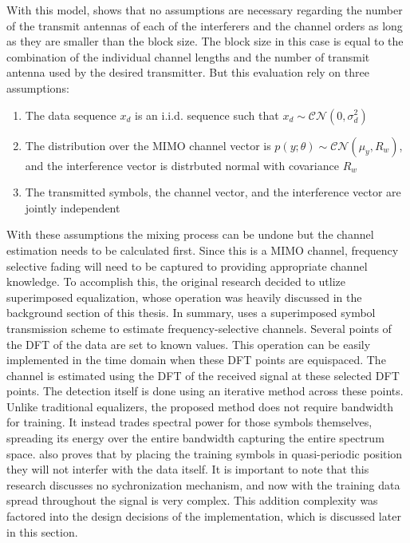 With this model, \cite{midterm_report} shows that no assumptions are necessary regarding the number of the transmit antennas of each of the interferers and the channel orders as long as they are smaller than the block size.  The block size in this case is equal to the combination of the individual channel lengths and the number of transmit antenna used by the desired transmitter.  But this evaluation rely on three assumptions:

\begin{enumerate}
\item The data sequence \(x_{d}\) is an i.i.d. sequence such that \(x_{d}\sim\mathcal{CN}(0,\sigma_{d}^{2})\)

\item The distribution over the MIMO channel vector is \(p(y;\theta)\sim\mathcal{CN}(\mu_{y},R_{w})\), and the interference vector is distrbuted normal with covariance \(R_{w}\)

\item The transmitted symbols, the channel vector, and the interference vector are jointly independent
\end{enumerate}

With these assumptions the mixing process can be undone but the channel estimation needs to be calculated first.  Since this is a MIMO channel, frequency selective fading will need to be captured to providing appropriate channel knowledge.  To accomplish this, the original research decided to utlize superimposed equalization, whose operation was heavily discussed in the background section of this thesis.  In summary, \cite{Ghogho} uses a superimposed symbol transmission scheme to estimate frequency-selective channels. Several points of the DFT of the data are set to known values. This operation can be easily implemented in the time domain when these DFT points are equispaced. The channel is estimated using the DFT of the received signal at these selected DFT points. The detection itself is done using an iterative method across these points.  Unlike traditional equalizers, the proposed method does not require bandwidth for training.  It instead trades spectral power for those symbols themselves, spreading its energy over the entire bandwidth capturing the entire spectrum space.   \cite{Ghogho} also proves that by placing the training symbols in quasi-periodic position they will not interfer with the data itself.  It is important to note that this research discusses no sychronization mechanism, and now with the training data spread throughout the signal is very complex.  This addition complexity was factored into the design decisions of the implementation, which is discussed later in this section.\\

